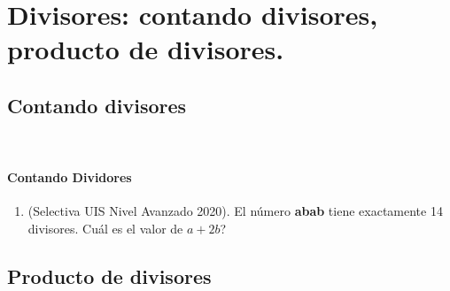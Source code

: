 \chapter{Divisores: contando divisores, producto de divisores.}\label{chapter:contandoDivisores}

\section{Contando divisores }\label{section:contandoDivisores}


\newpage
\begin{exers}{\ \\}
	\begin{center}
		\vspace{-1cm}
		\subsubsection*{ Contando Dividores }\label{ejercicios:contandoDivisores}
	\end{center}
	
	\begin{enumerate}
		\item (Selectiva UIS Nivel Avanzado 2020). El número \textbf{abab} tiene exactamente 14 divisores. Cuál es el valor de $a+2b$?
		
	\end{enumerate}
\end{exers}
\newpage


\section{Producto de divisores }\label{section:productoDeDivisores}
